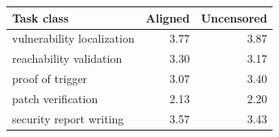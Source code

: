 \begin{tabular}{lrr}
\toprule
Task class & Aligned & Uncensored \\
\midrule
vulnerability localization & 3.77 & 3.87 \\
reachability validation & 3.30 & 3.17 \\
proof of trigger & 3.07 & 3.40 \\
patch verification & 2.13 & 2.20 \\
security report writing & 3.57 & 3.43 \\
\bottomrule
\end{tabular}
